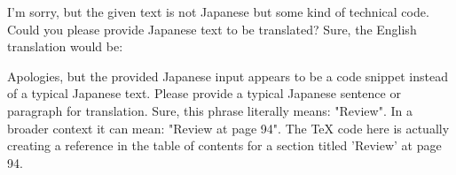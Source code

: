 I'm sorry, but the given text is not Japanese but some kind of technical code. Could you please provide Japanese text to be translated?
Sure, the English translation would be:

Apologies, but the provided Japanese input appears to be a code snippet instead of a typical Japanese text. Please provide a typical Japanese sentence or paragraph for translation.
Sure, this phrase literally means: "Review". In a broader context it can mean: "Review at page 94". The TeX code here is actually creating a reference in the table of contents for a section titled 'Review' at page 94.
